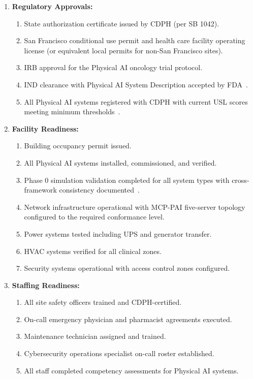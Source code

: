 \begin{enumerate}[label=(\alph*)]
\item \textbf{Regulatory Approvals:}
  \begin{enumerate}[label=(\arabic*)]
  \item State authorization certificate issued by CDPH (per SB 1042).
  \item San Francisco conditional use permit and health care facility operating
    license (or equivalent local permits for non-San Francisco sites).
  \item IRB approval for the Physical AI oncology trial protocol.
  \item IND clearance with Physical AI System Description accepted by
    FDA~\cite{cfr312adapt}.
  \item All Physical AI systems registered with CDPH with current USL scores
    meeting minimum thresholds~\cite{usl2026}.
  \end{enumerate}

\item \textbf{Facility Readiness:}
  \begin{enumerate}[label=(\arabic*)]
  \item Building occupancy permit issued.
  \item All Physical AI systems installed, commissioned, and verified.
  \item Phase 0 simulation validation completed for all system types with
    cross-framework consistency documented~\cite{iche6r3adapt}.
  \item Network infrastructure operational with MCP-PAI five-server topology
    configured to the required conformance level.
  \item Power systems tested including UPS and generator transfer.
  \item HVAC systems verified for all clinical zones.
  \item Security systems operational with access control zones configured.
  \end{enumerate}

\item \textbf{Staffing Readiness:}
  \begin{enumerate}[label=(\arabic*)]
  \item All site safety officers trained and CDPH-certified.
  \item On-call emergency physician and pharmacist agreements executed.
  \item Maintenance technician assigned and trained.
  \item Cybersecurity operations specialist on-call roster established.
  \item All staff completed competency assessments for Physical AI systems.
  \end{enumerate}


\end{enumerate}
